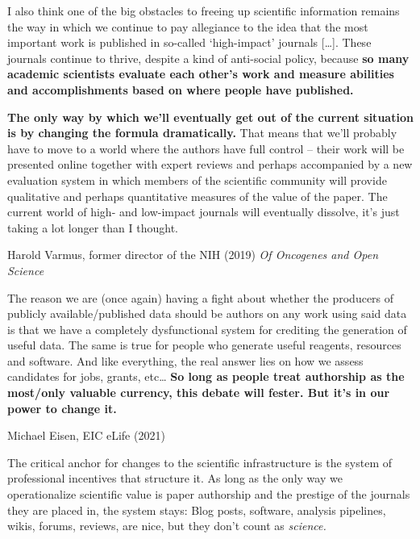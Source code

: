 \begin{leftbar}
I also think one of the big obstacles to freeing up scientific
information remains the way in which we continue to pay allegiance to
the idea that the most important work is published in so-called
`high-impact' journals {[}\ldots{]}. These journals continue to thrive,
despite a kind of anti-social policy, because \textbf{so many academic
scientists evaluate each other's work and measure abilities and
accomplishments based on where people have published.}

\textbf{The only way by which we'll eventually get out of the current
situation is by changing the formula dramatically.} That means that
we'll probably have to move to a world where the authors have full
control -- their work will be presented online together with expert
reviews and perhaps accompanied by a new evaluation system in which
members of the scientific community will provide qualitative and perhaps
quantitative measures of the value of the paper. The current world of
high- and low-impact journals will eventually dissolve, it's just taking
a lot longer than I thought.

Harold Varmus, former director of the NIH (2019) \emph{Of Oncogenes and
Open Science} \citep{varmusOncogenesOpenScience2019} 
\end{leftbar}

\begin{leftbar}
The reason we are (once again) having a fight about whether the
producers of publicly available/published data should be authors on any
work using said data is that we have a completely dysfunctional system
for crediting the generation of useful data. \citep{eisenReasonWeAre2021}  The same is true for people who generate
useful reagents, resources and software. \citep{eisenSameTruePeople2021}  And like everything, the real answer lies
on how we assess candidates for jobs, grants, etc\ldots{} \textbf{So
long as people treat authorship as the most/only valuable currency, this
debate will fester. But it's in our power to change it.} \citep{eisenEverythingRealAnswer2021} 

Michael Eisen, EIC eLife (2021)
\end{leftbar}

The critical anchor for changes to the scientific infrastructure is the
system of professional incentives that structure it. As long as the only
way we operationalize scientific value is paper authorship and the
prestige of the journals they are placed in, the system stays: Blog
posts, software, analysis pipelines, wikis, forums, reviews, are nice,
but they don't count as \emph{science.}

